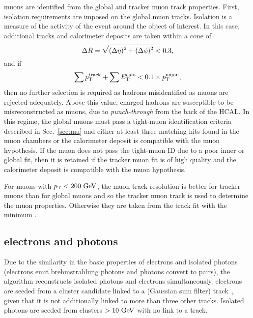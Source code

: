 \PF{} muons are identified from the global and tracker muon track properties.
First, isolation requirements are imposed on the global muon tracks.
Isolation is a measure of the activity of the event around the object of interest.
In this case, additional tracks and calorimeter deposits are taken within a cone of 
\begin{equation}
	\Delta R=\sqrt{\smash[b]{(\Delta\eta)^2+(\Delta\phi)^2}} < 0.3,
\end{equation}
and if 
\begin{equation*}
	\sum p_{\mathrm{T}}^{\text{track}}+\sum E_{\mathrm{T}}^{\text{calo}} < 0.1\times p_{\mathrm{T}}^{\text{muon}},
\end{equation*}
then no further selection is required as hadrons misidentified as muons are rejected adequately.
Above this value, charged hadrons are susceptible to be misreconstructed as muons, due to \textit{punch-through} from the back of the HCAL.
In this regime, the global muons must pass a tight-muon identification criteria described in Sec.~\ref{sec:mu} and either at least three matching hits found in the muon chambers or the calorimeter deposit is compatible with the muon hypothesis.
If the muon does not pass the tight-muon ID due to a poor inner or global fit, then it is retained if the tracker muon fit is of high quality and the calorimeter deposit is compatible with the muon hypothesis.

For muons with $p_{\mathrm{T}}<200\mathrm{~Ge\hspace{-.08em}V}^{}$, the muon track resolution is better for tracker muons than for global muons and so the tracker muon track is used to determine the muon properties.
Otherwise they are taken from the track fit with the minimum \chisq{}.

\subsection{\PF{} electrons and photons} %
\label{sub:pf_electrons_and_photons}

Due to the similarity in the basic properties of electrons and isolated photons (electrons emit brehmstrahlung photons and photons convert to \electronp{}\electronm{} pairs), the \PF{} algorithm reconstructs isolated \PF{} photons and \PF{} electrons simultaneously.
\PF electrons are seeded from a cluster candidate linked to a \GSF{} (Gaussian sum filter) track~\cite{Event:GSF}, given that it is not additionally linked to more than three other tracks.
Isolated \PF{} photons are seeded from clusters $>10\mathrm{~Ge\hspace{-.08em}V}^{}$ with no link to a \GSF{} track.

